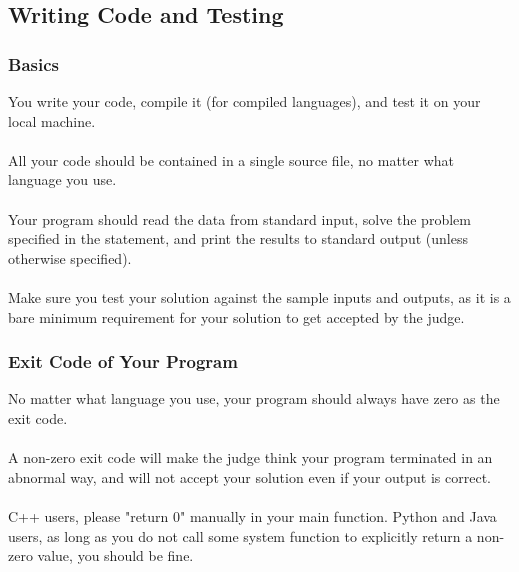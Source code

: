 \documentclass {article}
\begin{document}
\newpage
\subsection{Writing Code and Testing}
\subsubsection{Basics}
You write your code, compile it (for compiled languages), and test it on your
local machine.\\\\
All your code should be contained in a single source file, no matter what
language you use.\\\\
Your program should read the data from standard input, solve the problem
specified in the statement, and print the results to standard output (unless
otherwise specified).\\\\
Make sure you test your solution against the sample inputs and outputs, as it is
a bare minimum requirement for your solution to get accepted by the judge.

\subsubsection{Exit Code of Your Program}
No matter what language you use, your program should always have zero as the
exit code.\\\\
A non-zero exit code will make the judge think your program terminated in an
abnormal way, and will not accept your solution even if your output is
correct.\\\\
C++ users, please "return 0" manually in your main function. 
Python and Java users, as long as you do not call some system 
function to explicitly return a non-zero value, you should be fine.
\end{document}
